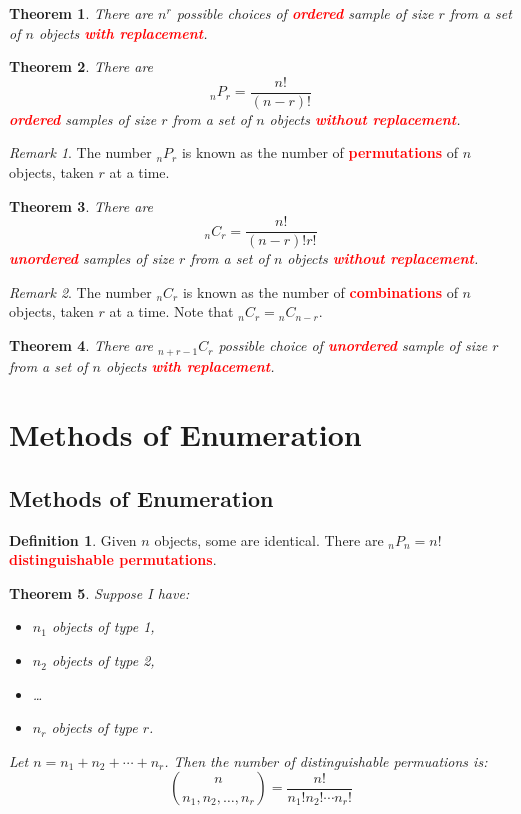 \documentclass{article}
\newcommand{\bfred}[1]{\textcolor{red}{\textbf{#1}}}
\theoremstyle{plain}
\newtheorem{thm}{Theorem}[section]
\theoremstyle{definition}
\newtheorem{defn}{Definition}[section]
\theoremstyle{remark}
\newtheorem*{rem}{Remark}
\begin{document}
\begin{thm}
    There are $n^r$ possible choices of \bfred{ordered} sample of size $r$ from a set of $n$ objects \bfred{with replacement}.
\end{thm}

\begin{thm}
    There are \[{}_nP_r = \frac{n!}{(n-r)!}\] \bfred{ordered} samples of size $r$ from a set of $n$ objects \bfred{without replacement}.
\end{thm}

\begin{rem}
    The number ${}_nP_r$ is known as the number of \bfred{permutations} of $n$ objects, taken $r$ at a time.
\end{rem}

\begin{thm}
    There are \[{}_nC_r = \frac{n!}{(n-r)!r!}\] \bfred{unordered} samples of size $r$ from a set of $n$ objects \bfred{without replacement}.
\end{thm}

\begin{rem}
    The number ${}_nC_r$ is known as the number of \bfred{combinations} of $n$ objects, taken $r$ at a time. Note that ${}_nC_r = {}_nC_{n-r}$.
\end{rem}

\begin{thm}
    There are ${}_{n+r-1}C_r$ possible choice of \bfred{unordered} sample of size $r$ from a set of $n$ objects \bfred{with replacement}.
\end{thm}

\section{Methods of Enumeration}
\subsection{Methods of Enumeration}

\begin{defn}
    Given $n$ objects, some are identical. There are ${}_nP_n = n!$ \bfred{distinguishable permutations}.
\end{defn}

\begin{thm}
    Suppose I have:
    \begin{itemize}
        \item $n_1$ objects of type 1,
        \item $n_2$ objects of type 2,
        \item \ldots 
        \item $n_r$ objects of type $r$.
    \end{itemize}

    Let $n = n_1 + n_2 + \dotsb + n_r$. Then the number of distinguishable permuations is: \[\binom{n}{n_1, n_2, \dotsc, n_r} = \frac{n!}{n_1!n_2! \dotsm n_r!}\]
\end{thm}
\end{document}
